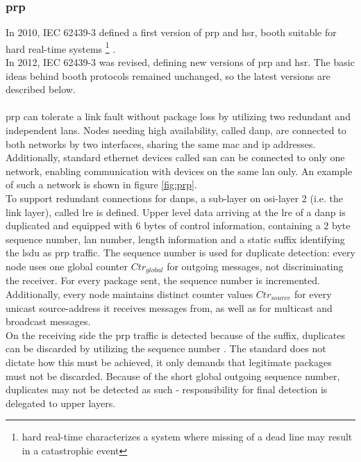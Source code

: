 \subsubsection{\gls{prp}}
In 2010, IEC 62439-3 defined a first version of {\gls{prp}} and \gls{hsr}, booth suitable for hard real-time
systems \footnote{hard real-time characterizes a system where missing of a dead line may result in a catastrophic event} \cite{4416946}.
\\
In 2012, IEC 62439-3 was revised, defining new versions of \gls{prp} and \gls{hsr}. The basic ideas behind booth protocols remained
unchanged, so the latest versions are described below.
\\
\\
\gls{prp} can tolerate a link fault without package loss by utilizing two redundant and independent \glspl{lan}.
Nodes needing high availability, called \gls{danp}, are connected to both networks by two interfaces, sharing the same \gls{mac} and \gls{ip} addresses.
Additionally, standard ethernet devices called \gls{san} can be connected to only one network, enabling communication with devices on the same \gls{lan} only.
An example of such a network is shown in figure \ref{fig:prp}.
\\
To support redundant connections for \glspl{danp}, a sub-layer on \gls{osi}-layer 2 (i.e. the link layer), called \gls{lre} is defined. 
Upper level data arriving at the \gls{lre} of a \gls{danp} is duplicated and equipped with 6 bytes of control information, containing a 2 byte sequence number,
\gls{lan} number, length information and a static suffix identifying the \gls{lsdu} as \gls{prp} traffic. The sequence number is used for duplicate detection: 
every node uses one global counter $Ctr_{global}$ for outgoing messages, not discriminating the receiver. For every package sent, the sequence number is incremented.
Additionally, every node maintains distinct counter values $Ctr_{source}$ for every unicast source-address it receives messages from, as well as for multicast
and broadcast messages.
\\
On the receiving side the \gls{prp} traffic is detected because of the suffix, duplicates can be discarded by utilizing the sequence number \cite{6699852}.
The standard does not dictate how this must be achieved, it only demands that legitimate packages must not be discarded. Because of the short global outgoing 
sequence number, duplicates may not be detected as such - responsibility for final detection is delegated to upper layers.
